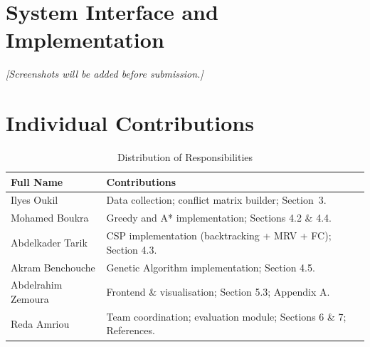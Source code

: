 \section{System Interface and Implementation}
\label{app:screenshots}

\noindent\textit{[Screenshots will be added before submission.]}

\newpage
\section{Individual Contributions}
\label{app:contributions}

\begin{table}[H]
  \centering
  \caption{Distribution of Responsibilities}
  \label{tab:contributions}
  \begin{tabularx}{\linewidth}{lX}
    \toprule
    \textbf{Full Name} & \textbf{Contributions} \\
    \midrule
    Ilyes Oukil  & Data collection; conflict matrix builder; Section~3. \\
    Mohamed Boukra  & Greedy and A* implementation; Sections 4.2 \& 4.4. \\
    Abdelkader Tarik & CSP implementation (backtracking + MRV + FC); Section 4.3. \\
    Akram Benchouche & Genetic Algorithm implementation; Section 4.5. \\
    Abdelrahim Zemoura  & Frontend \& visualisation; Section 5.3; Appendix A. \\
    Reda Amriou  & Team coordination; evaluation module; Sections 6 \& 7; References. \\
    \bottomrule
  \end{tabularx}
\end{table}


